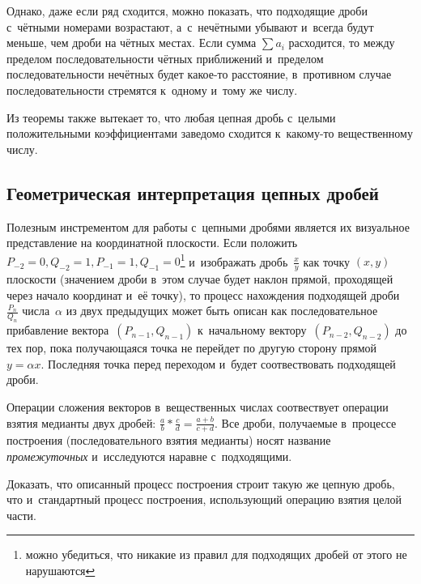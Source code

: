 \documentclass{article}
\begin{document}
Однако, даже если ряд сходится, можно показать, что подходящие дроби с~чётными
номерами возрастают, а~с~нечётными убывают и~всегда будут меньше, чем дроби на
чётных местах. Если сумма $\sum a_i$ расходится, то между пределом
последовательности чётных приближений и~пределом последовательности нечётных
будет какое-то расстояние, в~противном случае последовательности стремятся
к~одному и~тому же числу.

Из теоремы также вытекает то, что любая цепная дробь с~целыми положительными
коэффициентами заведомо сходится к~какому-то вещественному числу.

\subsection{Геометрическая интерпретация цепных дробей}

Полезным инстрементом для работы с~цепными дробями является их визуальное
представление на координатной плоскости. Если положить $P_{-2} = 0, Q_{-2} = 1,
P_{-1} = 1, Q_{-1} = 0$\footnote{можно убедиться, что никакие из правил для
подходящих дробей от этого не нарушаются} и~изображать дробь~$\frac{x}{y}$ как
точку $(x, y)$ плоскости (значением дроби в~этом случае будет наклон прямой,
проходящей через начало координат и~её точку), то процесс нахождения подходящей
дроби $\frac{P_n}{Q_n}$ числа~$\alpha$ из двух предыдущих может быть описан как
последовательное прибавление вектора~$(P_{n-1},Q_{n-1})$ к~начальному
вектору~$(P_{n-2},Q_{n-2})$ до тех пор, пока получающаяся точка не перейдет по
другую сторону прямой~$y = \alpha x$. Последняя точка перед переходом и~будет
соотвествовать подходящей дроби.

Операции сложения векторов в~вещественных числах соотвествует операции взятия
медианты двух дробей: $\frac{a}{b} \ast \frac{c}{d} = \frac{a + b}{c + d}$. Все
дроби, получаемые в~процессе построения (последовательного взятия медианты)
носят название \emph{промежуточных} и~исследуются наравне с~подходящими.

\begin{exercise}
  Доказать, что описанный процесс построения строит такую же цепную дробь, что
  и~стандартный процесс построения, использующий операцию взятия целой части.
\end{exercise}
\end{document}
